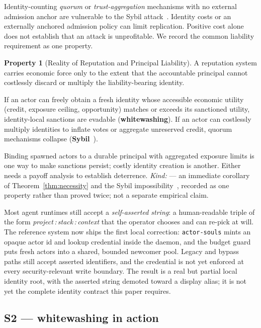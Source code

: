 \documentclass[11pt,a4paper]{article}
\theoremstyle{definition}
\newtheorem{property}{Property}[section]
\begin{document}
\noindent Identity-counting \emph{quorum} or \emph{trust-aggregation} mechanisms
with no external admission anchor are vulnerable to the Sybil
attack~. Identity costs or an externally anchored
admission policy can limit replication.
Positive cost alone does not establish that an attack is unprofitable. We
record the common liability requirement as one property.

\begin{property}[Reality of Reputation and Principal \mbox{Liability}]\label{prop:reality}
\setlength{\parskip}{4pt plus 1pt}
A reputation system carries economic force only to the extent that the accountable principal cannot costlessly discard or multiply the liability-bearing identity. 

If an actor can freely obtain a fresh identity whose accessible economic utility (credit, exposure ceiling, opportunity) matches or exceeds its sanctioned utility, identity-local sanctions are evadable (\textbf{whitewashing}). If an actor can costlessly multiply identities to inflate votes or aggregate unreserved credit, quorum mechanisms collapse (\textbf{Sybil}~). 

Binding spawned actors to a durable principal with aggregated exposure limits is one way to make sanctions persist; costly identity creation is another. Either needs a payoff analysis to establish deterrence. \emph{Kind:} \TheoremKind{} --- an immediate corollary of Theorem~\ref{thm:necessity} and the Sybil impossibility~, recorded as one property rather than proved twice; not a separate empirical claim.
\end{property}

\noindent Most agent runtimes still accept a \emph{self-asserted string}: a
human-readable triple of the form \emph{project\,:\,stack\,:\,context} that the
operator chooses and can re-pick at will. The reference system now ships the first
local correction: \texttt{actor-souls} mints an opaque actor id and lookup
credential inside the daemon, and the budget guard puts fresh actors into a shared,
bounded newcomer pool. Legacy and bypass paths still accept asserted identifiers,
and the credential is not yet enforced at every security-relevant write boundary.
The result is a real but partial local identity root, with the asserted string
demoted toward a display alias; it is not yet the complete identity contract this
paper requires.

\subsection{S2 --- whitewashing in action}
\end{document}

